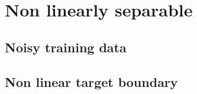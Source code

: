 \section {Non linearly separable}

\subsection {Noisy training data}
\subsection {Non linear target boundary}